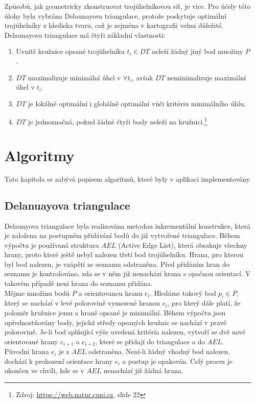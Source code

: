 \documentclass[a4paper, 12pt]{article}
\begin{document}
Způsobů, jak geometricky zkonstruovat trojúhelníkovou síť, je více. Pro účely této úlohy byla vybrána Delaunayova triangulace, protože poskytuje optimální trojúhelníky z hlediska tvaru, což je zejména v kartografii velmi důležité. Delaunayova triangulace má čtyři základní vlastnosti:
\begin{enumerate}
\item Uvnitř kružnice opsané trojúhelníku $t_i \in DT$ neleží žádný jiný bod množiny $P$.
\item $DT$ maximalizuje minimální úhel v $\forall t_i$, avšak $DT$ neminimalizuje maximální úhel v $t_i$.
\item $DT$ je lokálně optimální i globálně optimální vůči kritériu minimálního úhlu.
\item $DT$ je jednoznačná, pokud žádné čtyři body neleží na kružnici.\footnote{Zdroj: \href{https://web.natur.cuni.cz/~bayertom/images/courses/Adk/adk5.pdf}{https://web.natur.cuni.cz}, slide 22}
\end{enumerate}
\vspace{0.4cm}

\section{Algoritmy}
Tato kapitola se zabývá popisem algoritmů, které byly v aplikaci implementovány. 

\subsection{Delanuayova triangulace}
Delaunyova triangulace byla realizována metodou inkrementální konstrukce, která je zalo\-že\-na na postupném přidávání bodů do již vytvořené triangulace. Během výpočtu je používaná struktura $AEL$ (Active Edge List), která obsahuje všechny hrany, proto které ještě nebyl nalezen třetí bod trojúhelníku. Hrana, pro kterou byl bod nalezen, je vzápětí ze seznamu odstraněna. Před přidáním hran do seznamu je kontrolováno, zda se v něm již nenachází hrana s opačnou orientací. V takovém případě není hrana do seznamu přidána.\\

Mějme množinu bodů $P$ a orientovanou hranu $e_i$. Hledáme takový bod $p_i \in P$, který se nachází v levé polorovině vymezené hranou $e_i$, pro který dále platí, že poloměr kružnice jemu a hraně opsané je minimální. Během výpočtu jsou upřednostňovány body, jejichž středy opsaných kružnic se nachází v pravé polorovině. Je-li bod splňující výše uvedená kritéria nalezen, vytvoří se dvě nové orientované hrany $e_{i+1}$ a $e_{i+2}$, které se přidají do triangulace a do $AEL$. Původní hrana $e_i$ je z $AEL$ odstraněna. Není-li žádný vhodný bod nalezen, dochází k prohození orientace hrany $e_i$ a postup je opakován. Celý proces je ukončen ve chvíli, kde se v $AEL$ nenachází již žádná hrana. \\ 
\end{document}
